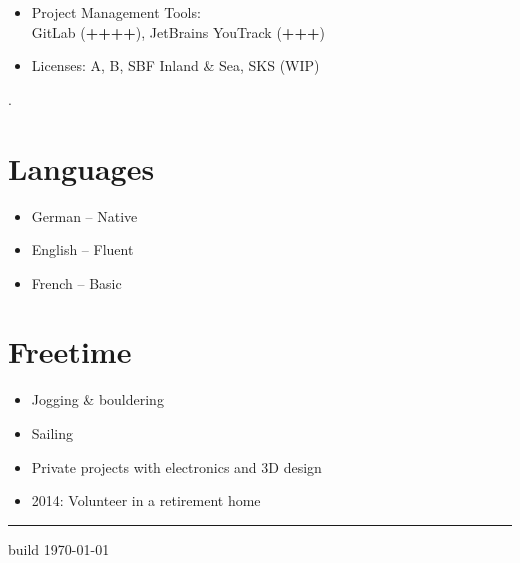 \documentclass[a4paper,11pt]{article}
\newcommand{\col}[2]{\textcolor[HTML]{#1}{#2}}
\begin{document}
\begin{minipage}[t]{0.65\textwidth}
\begin{minipage}[t]{0.625\textwidth}
\begin{itemize}
            \item Project Management Tools:\\
            GitLab (\textbf{++++}), JetBrains YouTrack (\textbf{+++})

            \item Licenses: A, B, SBF Inland \& Sea, SKS (WIP)
        \end{itemize}
    \end{minipage}
    \hfill
    \begin{minipage}[t]{0.325\textwidth}
        \col{ffffff}{.} %
        \section*{\col{6c84ac}{Languages}}
        \begin{itemize}
            \small
            \item German -- Native
            \item English -- Fluent
            \item French -- Basic
        \end{itemize}

        \section*{\col{587aab}{Freetime}}
        \begin{itemize}
            \small
            \item Jogging \& bouldering
            \item Sailing
            \item Private projects with electronics and 3D design
            \item 2014: Volunteer in a retirement home
        \end{itemize}
    \end{minipage}

\end{minipage}

\vfill
\hfill
\vspace{0.17cm}
\begin{minipage}[t]{0.65\textwidth}
    \hrule
    \vspace{0.125cm}

    \small build \href{\giturl}{\texttt{\gitcommit}} \hfill \today
\end{minipage}
\end{document}
